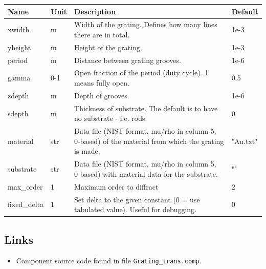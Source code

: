 \begin{longtable}{p{}p{}p{}p{}}
\toprule
\textbf{Name} & \textbf{Unit} & \textbf{Description} & \textbf{Default} \\
\midrule
\endhead
xwidth & m & Width of the grating. Defines how many lines there are in total. & 1e-3 \\
yheight & m & Height of the grating. & 1e-3 \\
period & m & Distance between grating grooves. & 1e-6 \\
gamma & 0-1 & Open fraction of the period (duty cycle). 1 means fully open. & 0.5 \\
zdepth & m & Depth of grooves. & 1e-6 \\
sdepth & m & Thickness of substrate. The default is to have no substrate - i.e. rods. & 0 \\
material & str & Data file (NIST format, mu/rho in column 5, 0-based) of the material from which the grating is made. & "Au.txt" \\
substrate & str & Data file (NIST format, mu/rho in column 5, 0-based) with material data for the substrate. & "" \\
max\_order & 1 & Maximum order to diffract & 2 \\
fixed\_delta & 1 & Set delta to the given constant (0 = use tabulated value). Useful for debugging. & 0 \\
\bottomrule
\end{longtable}

\subsection*{Links}
\begin{itemize}
  \item Component source code found in file \texttt{Grating\_trans.comp}.
\end{itemize}
